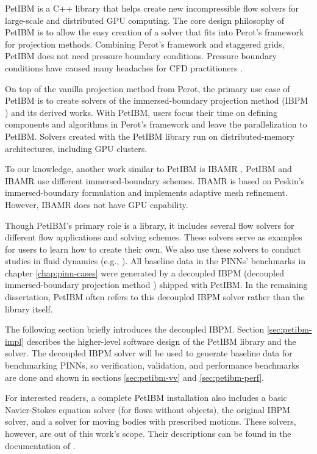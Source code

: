 PetIBM is a C++ library that helps create new incompressible flow solvers for large-scale and distributed GPU computing.
The core design philosophy of PetIBM is to allow the easy creation of a solver that fits into Perot's framework \cite{perot_analysis_1993} for projection methods.
Combining Perot's framework and staggered grids, PetIBM does not need pressure boundary conditions.
Pressure boundary conditions have caused many headaches for CFD practitioners \cite{gresho_pressure_1987,sani_resume_1994}.

On top of the vanilla projection method from Perot, the primary use case of PetIBM is to create solvers of the immersed-boundary projection method (IBPM \cite{taira_immersed_2007}) and its derived works.
With PetIBM, users focus their time on defining components and algorithms in Perot's framework and leave the parallelization to PetIBM.
Solvers created with the PetIBM library run on distributed-memory architectures, including GPU clusters.

To our knowledge, another work similar to PetIBM is IBAMR \cite{griffith_adaptive_2007,bhalla_unified_2013}. 
PetIBM and IBAMR use different immersed-boundary schemes.
IBAMR is based on Peskin's immersed-boundary formulation \cite{Peskin2002} and implements adaptive mesh refinement.
However, IBAMR does not have GPU capability.

Though PetIBM's primary role is a library, it includes several flow solvers for different flow applications and solving schemes.
These solvers serve as examples for users to learn how to create their own.
We also use these solvers to conduct studies in fluid dynamics (e.g., \cite{mesnard_reproducible_2017}).
All baseline data in the PINNs' benchmarks in chapter \ref{chap:pinn-cases} were generated by a decoupled IBPM (decoupled immersed-boundary projection method \cite{li_efficient_2016}) shipped with PetIBM.
In the remaining dissertation, PetIBM often refers to this decoupled IBPM solver rather than the library itself.

The following section briefly introduces the decoupled IBPM.
Section \ref{sec:petibm-impl} describes the higher-level software design of the PetIBM library and the solver.
The decoupled IBPM solver will be used to generate baseline data for benchmarking PINNs, so verification, validation, and performance benchmarks are done and shown in sections \ref{sec:petibm-vv} and \ref{sec:petibm-perf}.

For interested readers, a complete PetIBM installation also includes a basic Navier-Stokes equation solver (for flows without objects), the original IBPM solver, and a solver for moving bodies with prescribed motions.
These solvers, however, are out of this work's scope.
Their descriptions can be found in the documentation of \cite{chuang_petibm:_2018}.
